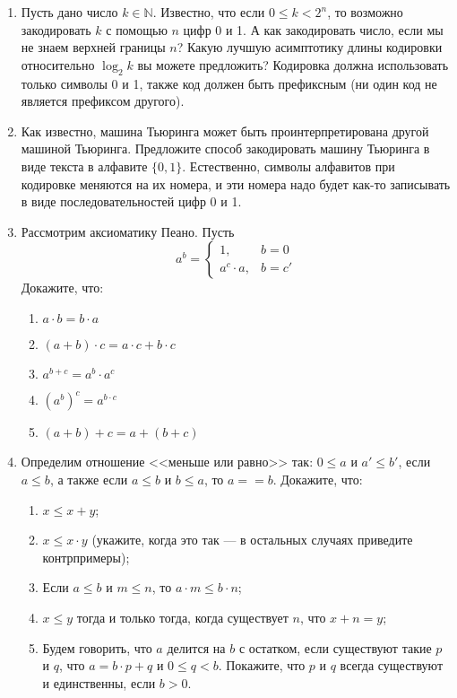 \documentclass[10pt,a4paper,oneside]{article}
\begin{document}
\begin{enumerate}
\item Пусть дано число $k \in \mathbb{N}$. Известно, что если $0 \le k < 2^n$, то возможно закодировать $k$ с помощью $n$ цифр 0 и 1.
А как закодировать число, если мы не знаем верхней границы $n$? Какую лучшую асимптотику длины кодировки относительно $\log_2 k$ вы можете
предложить? Кодировка должна использовать только символы 0 и 1, также код должен быть префиксным (ни один код не является префиксом другого).

\item Как известно, машина Тьюринга может быть проинтерпретирована другой машиной Тьюринга.
Предложите способ закодировать машину Тьюринга в виде текста в алфавите $\{0,1\}$.
Естественно, символы алфавитов при кодировке меняются на их номера, и эти номера надо будет как-то записывать в виде последовательностей цифр 0 и 1.

\item Рассмотрим аксиоматику Пеано. 
Пусть $$a^b = \left\{\begin{array}{ll}1,& b= 0 \\a^c\cdot a,&b = c'\end{array}\right.$$
Докажите, что:
\begin{enumerate}
\item $a \cdot b = b \cdot a$
\item $(a + b) \cdot c = a \cdot c + b \cdot c$
\item $a^{b+c} = a^b \cdot a^c$
\item $(a^b)^c = a^{b \cdot c}$
\item $(a + b) + c = a + (b + c)$
\end{enumerate}

\item Определим отношение <<меньше или равно>> так: $0 \le a$ и $a' \le b'$, если $a \le b$, а также если $a \le b$ и $b \le a$, то $a == b$. Докажите, что:
\begin{enumerate}
\item $x \le x+y$;
\item $x \le x \cdot y$ (укажите, когда это так --- в остальных случаях приведите контрпримеры);
\item Если $a \le b$ и $m \le n$, то $a \cdot m \le b \cdot n$;
\item $x \le y$ тогда и только тогда, когда существует $n$, что $x + n = y$;
\item Будем говорить, что $a$ делится на $b$ с остатком, если существуют такие $p$ и $q$, что 
$a = b \cdot p + q$ и $0 \le q < b$. Покажите, что $p$ и $q$ всегда существуют и единственны,
если $b > 0$.
\end{enumerate}


\end{enumerate}
\end{document}
